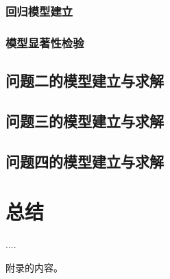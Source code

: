 \documentclass{cumcmthesis}
\begin{document}
            \subsubsection{回归模型建立}
            \subsubsection{模型显著性检验}
        \subsection{问题二的模型建立与求解}
        \subsection{问题三的模型建立与求解}
        \subsection{问题四的模型建立与求解}
        \section{总结}
        \begin{thebibliography}{9}%
             ....
        \end{thebibliography}
        \begin{appendices}
            附录的内容。
        \end{appendices}
\end{document}
